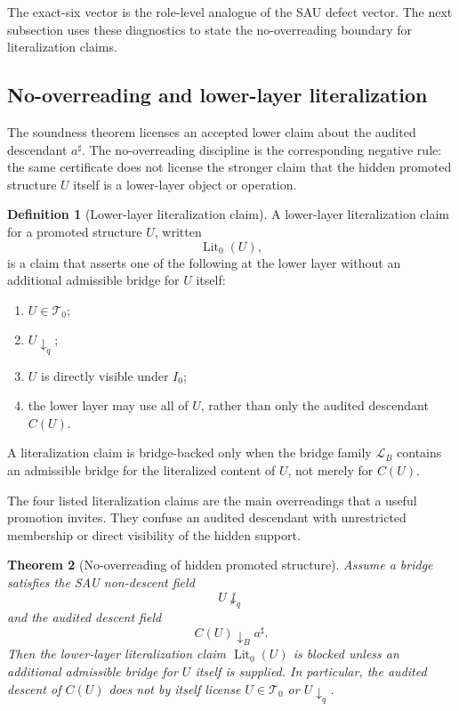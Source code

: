 \documentclass[11pt]{article}
\newcommand{\Lit}{\operatorname{Lit}}
\newtheorem{theorem}{Theorem}[section]
\theoremstyle{definition}
\newtheorem{definition}[theorem]{Definition}
\begin{document}
The exact-six vector is the role-level analogue of the SAU defect vector.  The
next subsection uses these diagnostics to state the no-overreading boundary for
literalization claims.

\subsection{No-overreading and lower-layer literalization}
\label{subsec:soundness-no-overreading}

The soundness theorem licenses an accepted lower claim about the audited
descendant \(a^\sharp\).  The no-overreading discipline is the corresponding
negative rule: the same certificate does not license the stronger claim that the
hidden promoted structure \(U\) itself is a lower-layer object or operation.

\begin{definition}[Lower-layer literalization claim]
\label{def:sau-literalization-claim}
A lower-layer literalization claim for a promoted structure \(U\), written
\[
\Lit_0(U),
\]
is a claim that asserts one of the following at the lower layer without an additional admissible bridge for \(U\) itself:
\begin{enumerate}
\item \(U\in\mathcal T_0\);
\item \(U\downarrow_q\);
\item \(U\) is directly visible under \(I_0\);
\item the lower layer may use all of \(U\), rather than only the audited descendant \(C(U)\).
\end{enumerate}
A literalization claim is bridge-backed only when the bridge family \(\mathcal L_B\) contains an admissible bridge for the literalized content of \(U\), not merely for \(C(U)\).
\end{definition}

The four listed literalization claims are the main overreadings that a useful
promotion invites.  They confuse an audited descendant with unrestricted
membership or direct visibility of the hidden support.

\begin{theorem}[No-overreading of hidden promoted structure]
\label{thm:sau-no-overreading-hidden-structure}
Assume a bridge satisfies the SAU non-descent field
\[
U\not\downarrow_q
\]
and the audited descent field
\[
C(U)\downarrow_B a^\sharp.
\]
Then the lower-layer literalization claim \(\Lit_0(U)\) is blocked unless an additional admissible bridge for \(U\) itself is supplied.  In particular, the audited descent of \(C(U)\) does not by itself license \(U\in\mathcal T_0\) or \(U\downarrow_q\).
\end{theorem}
\end{document}
